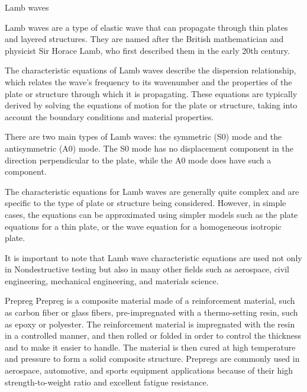 \documentclass[10pt,aspectratio=169,dvipsnames]{beamer} %
\begin{document}
	\begin{frame}{Lamb waves}
		\begin{footnotesize}
			Lamb waves are a type of elastic wave that can propagate through thin plates and layered structures. They are named after the British mathematician and physicist Sir Horace Lamb, who first described them in the early 20th century.
			
			The characteristic equations of Lamb waves describe the dispersion relationship, which relates the wave's frequency to its wavenumber and the properties of the plate or structure through which it is propagating. These equations are typically derived by solving the equations of motion for the plate or structure, taking into account the boundary conditions and material properties.
			
			There are two main types of Lamb waves: the symmetric (S0) mode and the antisymmetric (A0) mode. The S0 mode has no displacement component in the direction perpendicular to the plate, while the A0 mode does have such a component.
			
			The characteristic equations for Lamb waves are generally quite complex and are specific to the type of plate or structure being considered. However, in simple cases, the equations can be approximated using simpler models such as the plate equations for a thin plate, or the wave equation for a homogeneous isotropic plate.
			
			It is important to note that Lamb wave characteristic equations are used not only in Nondestructive testing but also in many other fields such as aerospace, civil engineering, mechanical engineering, and materials science.
		\end{footnotesize}
	\end{frame}
	\begin{frame}{Prepreg}
		\justifying\footnotesize
		Prepreg is a composite material made of a reinforcement material, such as carbon fiber or glass fibers, pre-impregnated with a thermo-setting resin, such as epoxy or polyester. 
		The reinforcement material is impregnated with the resin in a controlled manner, and then rolled or folded in order to control the thickness and to make it easier to handle. 
		The material is then cured at high temperature and pressure to form a solid composite structure. 
		Prepregs are commonly used in aerospace, automotive, and sports equipment applications because of their high strength-to-weight ratio and excellent fatigue resistance.			
	\end{frame}
\end{document}

